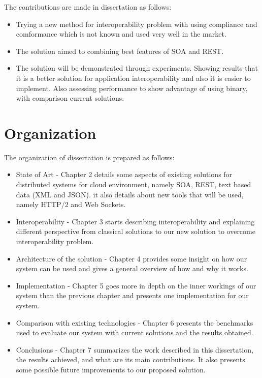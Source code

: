 The contributions are  made in dissertation as follows:

\begin{itemize}
  \item Trying a new method for interoperability problem with using compliance and comformance which is not known and used very well in the market.
  \item The solution aimed to combining best features of SOA and REST.
  \item The solution will be demonstrated through experiments. Showing results that it is a better solution for application interoperability and also it is easier to implement. Also assessing performance to show advantage of using binary, with comparison current solutions.
\end{itemize}

\section{Organization}
\label{section:organization}

The organization of dissertation is prepared as follows:

\begin{itemize}
\item State of Art - Chapter 2 details some aspects of existing solutions for distributed systems for cloud environment, namely SOA, REST, text based data (XML and JSON). it also details about new tools that will be used, namely HTTP/2 and Web Sockets.
\item Interoperability - Chapter 3 starts describing interoperability and explaining different perspective from classical solutions to our new solution to overcome interoperability problem.
\item Architecture of the solution - Chapter 4 provides some insight on how our system can be used and gives a general overview of how and why it works.
\item Implementation - Chapter 5 goes more in depth on the inner workings of our system than the previous chapter and presents one implementation for our system.
\item Comparison with existing technologies - Chapter 6 presents the benchmarks used to evaluate our system with current solutions and the results obtained.
\item Conclusions - Chapter 7 summarizes the work described in this dissertation, the results achieved, and what are its main contributions. It also presents some possible future improvements to our proposed solution.
\end{itemize}

